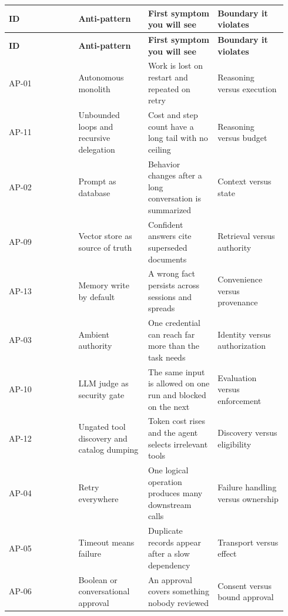 \BookTableStart
\fontsize{7.2}{9}\selectfont
\begin{longtable}{@{}Y{0.2350\linewidth}Y{0.2350\linewidth}Y{0.2350\linewidth}Y{0.2350\linewidth}@{}}
\color{white}\bfseries \textbf{ID} & \color{white}\bfseries \textbf{Anti-pattern} & \color{white}\bfseries \textbf{First symptom you will see} & \color{white}\bfseries \textbf{Boundary it violates} \\
\endfirsthead
{}
\color{white}\bfseries \textbf{ID} & \color{white}\bfseries \textbf{Anti-pattern} & \color{white}\bfseries \textbf{First symptom you will see} & \color{white}\bfseries \textbf{Boundary it violates} \\
\endhead
AP-01 & Autonomous monolith & Work is lost on restart and repeated on retry & Reasoning versus execution \\
AP-11 & Unbounded loops and recursive delegation & Cost and step count have a long tail with no ceiling & Reasoning versus budget \\
AP-02 & Prompt as database & Behavior changes after a long conversation is summarized & Context versus state \\
AP-09 & Vector store as source of truth & Confident answers cite superseded documents & Retrieval versus authority \\
AP-13 & Memory write by default & A wrong fact persists across sessions and spreads & Convenience versus provenance \\
AP-03 & Ambient authority & One credential can reach far more than the task needs & Identity versus authorization \\
AP-10 & LLM judge as security gate & The same input is allowed on one run and blocked on the next & Evaluation versus enforcement \\
AP-12 & Ungated tool discovery and catalog dumping & Token cost rises and the agent selects irrelevant tools & Discovery versus eligibility \\
AP-04 & Retry everywhere & One logical operation produces many downstream calls & Failure handling versus ownership \\
AP-05 & Timeout means failure & Duplicate records appear after a slow dependency & Transport versus effect \\
AP-06 & Boolean or conversational approval & An approval covers something nobody reviewed & Consent versus bound approval \\

\end{longtable}
